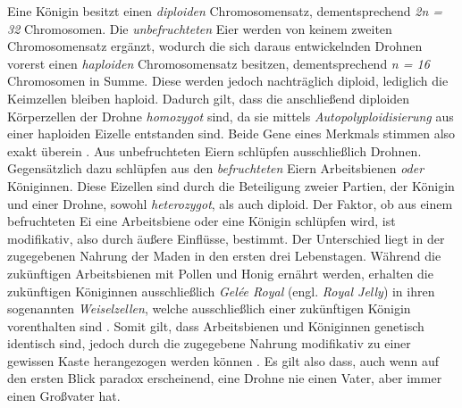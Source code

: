 Eine Königin besitzt einen \textit{diploiden} Chromosomensatz, dementsprechend \textit{2n = 32} Chromosomen. Die \textit{unbefruchteten} Eier werden von keinem zweiten Chromosomensatz ergänzt, wodurch die sich daraus entwickelnden Drohnen vorerst einen \textit{haploiden} Chromosomensatz besitzen, dementsprechend \textit{n = 16} Chromosomen in Summe. Diese werden jedoch nachträglich diploid, lediglich die Keimzellen bleiben haploid. Dadurch gilt, dass die anschließend diploiden Körperzellen der Drohne  \textit{homozygot} sind, da sie mittels \textit{Autopolyploidisierung} aus einer haploiden Eizelle entstanden sind. Beide Gene eines Merkmals stimmen also exakt überein \cite*[]{bees:homozygot}. Aus unbefruchteten Eiern schlüpfen ausschließlich Drohnen. Gegensätzlich dazu schlüpfen aus den \textit{befruchteten} Eiern Arbeitsbienen \textit{oder} Königinnen. Diese Eizellen sind durch die Beteiligung zweier Partien, der Königin und einer Drohne, sowohl \textit{heterozygot}, als auch diploid. Der Faktor, ob aus einem befruchteten Ei eine Arbeitsbiene oder eine Königin schlüpfen wird, ist modifikativ, also durch äußere Einflüsse, bestimmt. Der Unterschied liegt in der zugegebenen Nahrung der Maden in den ersten drei Lebenstagen. Während die zukünftigen Arbeitsbienen mit Pollen und Honig ernährt werden, erhalten die zukünftigen Königinnen ausschließlich \textit{Gelée Royal} (engl. \textit{Royal Jelly}) in ihren sogenannten \textit{Weiselzellen}, welche ausschließlich einer zukünftigen Königin vorenthalten sind \cite*[]{bees:swarm}. Somit gilt, dass Arbeitsbienen und Königinnen genetisch identisch sind, jedoch durch die zugegebene Nahrung modifikativ zu einer gewissen Kaste herangezogen werden können \cite*[]{bees:sex}. Es gilt also dass, auch wenn auf den ersten Blick paradox erscheinend, eine Drohne nie einen Vater, aber immer einen Großvater hat.

